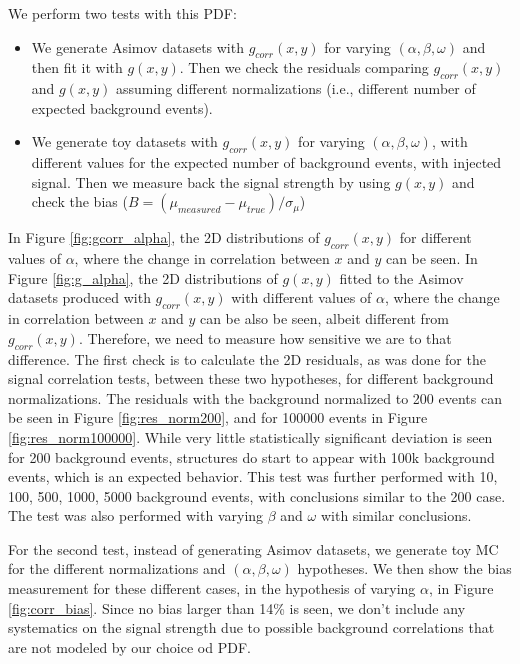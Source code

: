 We perform two tests with this PDF: 
\begin{itemize}
\item We generate Asimov datasets with $g_{corr}(x,y)$ for varying $(\alpha,\beta,\omega)$ and then fit it with $g(x,y)$. Then we check the residuals comparing $g_{corr}(x,y)$ and $g(x,y)$ assuming different normalizations (i.e., different number of expected background events).
\item We generate toy datasets with  $g_{corr}(x,y)$ for varying $(\alpha,\beta,\omega)$, with different values for the expected number of background events, with injected signal. Then we measure back the signal strength by using $g(x,y)$ and check the bias ($B = (\mu_{measured} - \mu_{true})/\sigma_{\mu}$)
\end{itemize}

In Figure \ref{fig:gcorr_alpha}, the 2D distributions of $g_{corr}(x,y)$ for different values of $\alpha$, where the change in correlation between $x$ and $y$ can be seen.  
In Figure \ref{fig:g_alpha}, the 2D distributions of $g(x,y)$ fitted to the Asimov datasets produced with  $g_{corr}(x,y)$ with different values of $\alpha$, where the change in correlation between $x$ and $y$ can be also be seen, albeit different from $g_{corr}(x,y)$. Therefore, we need to measure how sensitive we are to that difference. 
The first check is to calculate the 2D residuals, as was done for the signal correlation tests, between these two hypotheses, for different background normalizations. 
The residuals with the background normalized to 200 events can be seen in Figure \ref{fig:res_norm200}, and for 100000 events in Figure \ref{fig:res_norm100000}. 
While very little statistically significant deviation is seen for 200 background events, structures do start to appear with 100k background events, which is an expected behavior. 
This test was further performed with 10, 100, 500, 1000, 5000 background events, with conclusions similar to the 200 case. 
The test was also performed with varying $\beta$ and $\omega$ with similar conclusions. 

For the second test, instead of generating Asimov datasets, we generate toy MC for the different normalizations and $(\alpha,\beta,\omega)$ hypotheses. 
We then show the bias measurement for these different cases, in the hypothesis of varying $\alpha$, in Figure \ref{fig:corr_bias}. 
Since no bias larger than 14\% is seen, we don't include any systematics on the signal strength due to possible background correlations that are not modeled by our choice od PDF.

